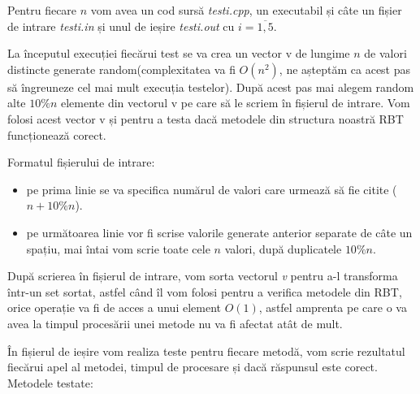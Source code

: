 \documentclass[]{report}
\begin{document}
	Pentru fiecare $n$ vom avea un cod sursă \emph{test\emph{i}.cpp}, un 
	executabil și câte un fișier de intrare \emph{test\emph{i}.in} și unul de 
	ieșire \emph{test\emph{i}.out} cu $i=\overline{1,5}$.

	La începutul execuției fiecărui test se va crea un vector v de lungime $n$
	de valori distincte generate random(complexitatea va fi $O(n^2)$, ne așteptăm
	ca acest pas să îngreuneze cel mai mult execuția testelor). După acest pas
	mai alegem random alte $10\%n$ elemente din vectorul v pe care să le scriem
	în fișierul de intrare. Vom folosi acest vector v și pentru a testa dacă
	metodele din structura noastră RBT funcționează corect.

	Formatul fișierului de intrare:
	\begin{itemize}
		\item pe prima linie se va specifica numărul de valori care urmează să
			fie citite ($n+10\%n$).
		\item pe următoarea linie vor fi scrise valorile generate anterior
			separate de câte un spațiu, mai întai vom scrie toate cele $n$ valori,
			după duplicatele $10\%n$.
	\end{itemize}

	După scrierea în fișierul de intrare, vom sorta vectorul \emph{v} pentru a-l
	transforma într-un set sortat, astfel când îl vom folosi pentru a verifica
	metodele din RBT, orice operație va fi de acces a unui element $O(1)$, astfel
	amprenta pe care o va avea la timpul procesării unei metode nu va fi afectat
	atât de mult.

	În fișierul de ieșire vom realiza teste pentru fiecare metodă, vom scrie
	rezultatul fiecărui apel al metodei, timpul de procesare și dacă răspunsul
	este corect. Metodele testate:
\end{document}

